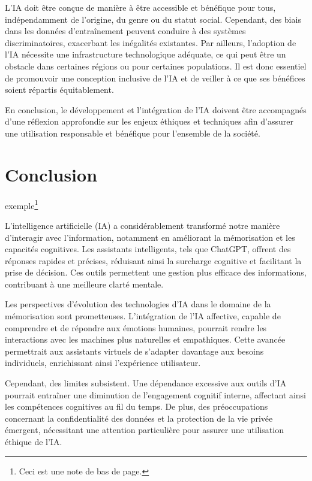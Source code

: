\documentclass[12pt,a4paper]{report}
\begin{document}
L'IA doit être conçue de manière à être accessible et bénéfique pour tous, indépendamment de l'origine, du genre ou du statut social. Cependant, des biais dans les données d'entraînement peuvent conduire à des systèmes discriminatoires, exacerbant les inégalités existantes. Par ailleurs, l'adoption de l'IA nécessite une infrastructure technologique adéquate, ce qui peut être un obstacle dans certaines régions ou pour certaines populations. Il est donc essentiel de promouvoir une conception inclusive de l'IA et de veiller à ce que ses bénéfices soient répartis équitablement.

En conclusion, le développement et l'intégration de l'IA doivent être accompagnés d'une réflexion approfondie sur les enjeux éthiques et techniques afin d'assurer une utilisation responsable et bénéfique pour l'ensemble de la société.

\chapter*{Conclusion}
exemple\footnote{Ceci est une note de bas de page.}

L'intelligence artificielle (IA) a considérablement transformé notre manière d'interagir avec l'information, notamment en améliorant la mémorisation et les capacités cognitives. Les assistants intelligents, tels que ChatGPT, offrent des réponses rapides et précises, réduisant ainsi la surcharge cognitive et facilitant la prise de décision. Ces outils permettent une gestion plus efficace des informations, contribuant à une meilleure clarté mentale.

Les perspectives d'évolution des technologies d'IA dans le domaine de la mémorisation sont prometteuses. L'intégration de l'IA affective, capable de comprendre et de répondre aux émotions humaines, pourrait rendre les interactions avec les machines plus naturelles et empathiques. Cette avancée permettrait aux assistants virtuels de s'adapter davantage aux besoins individuels, enrichissant ainsi l'expérience utilisateur.

Cependant, des limites subsistent. Une dépendance excessive aux outils d'IA pourrait entraîner une diminution de l'engagement cognitif interne, affectant ainsi les compétences cognitives au fil du temps. De plus, des préoccupations concernant la confidentialité des données et la protection de la vie privée émergent, nécessitant une attention particulière pour assurer une utilisation éthique de l'IA.
\end{document}
